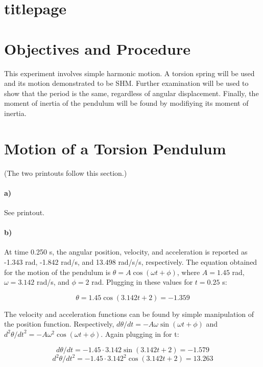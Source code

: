 \documentclass[12pt]{article}
\begin{document}
\section{titlepage}
\newpage

\section{Objectives and Procedure}
This experiment involves simple harmonic motion.  A torsion spring will be
used and its motion demonstrated to be SHM.  Further examination will be
used to show that the period is the same, regardless of angular displacement.
Finally, the moment of inertia of the pendulum will be found by modifiying
its moment of inertia.

\newpage

\section{Motion of a Torsion Pendulum}
\begin{center}
(The two printouts follow this section.)
\end{center}

\paragraph{a)}
See printout.

\paragraph{b)}
At time 0.250 s, the angular position, velocity, and acceleration is reported
as -1.343 rad, -1.842 rad/s, and 13.498 rad/s/s, respectively.  The equation 
obtained for the motion of the pendulum is \(\theta=A\cos(\omega t + \phi)\),
where \(A = 1.45\) rad, \(\omega = 3.142\) rad/s, and \(\phi = 2\) rad.  
Plugging in these values for \(t = 0.25\) s:

\[\theta=1.45 \cos(3.142 t + 2) = -1.359\]

The velocity and acceleration functions can be found by simple manipulation
of the position function.  Respectively, \(d\theta/dt =
-A\omega\sin(\omega t + \phi)\) and \(d^2\theta/{dt}^2 = -A\omega^2\cos(
\omega t + \phi)\).  Again plugging in for t:

\[d\theta/dt = -1.45\cdot 3.142\sin(3.142t + 2) = -1.579\]
\[d^2\theta/{dt}^2 = -1.45\cdot 3.142^2\cos(3.142t + 2) = 13.263\]

\newpage
\end{document}
